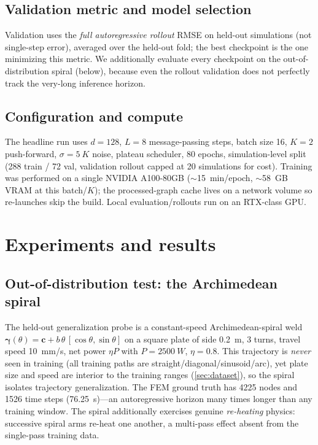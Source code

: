 \documentclass[11pt]{article}
\theoremstyle{definition}
\begin{document}
\subsection{Validation metric and model selection}

Validation uses the \emph{full autoregressive rollout} RMSE on held-out simulations
(not single-step error), averaged over the held-out fold; the best checkpoint is the one
minimizing this metric. We additionally evaluate every checkpoint on the out-of-
distribution spiral (below), because even the rollout validation does not perfectly
track the very-long inference horizon.

\subsection{Configuration and compute}

The headline run uses $d=128$, $L=8$ message-passing steps, batch size 16, $K=2$
push-forward, $\sigma=\SI{5}{K}$ noise, plateau scheduler, 80 epochs, simulation-level
split (\num{288} train / \num{72} val, validation rollout capped at 20 simulations for
cost). Training was performed on a single NVIDIA A100-80GB ($\sim$\SI{15}{min}/epoch,
$\sim$\SI{58}{GB} VRAM at this batch/$K$); the processed-graph cache lives on a network
volume so re-launches skip the build. Local evaluation/rollouts run on an RTX-class GPU.

\section{Experiments and results}
\label{sec:results}

\subsection{Out-of-distribution test: the Archimedean spiral}

The held-out generalization probe is a constant-speed Archimedean-spiral weld
$\bm\gamma(\theta)=\bm c+b\,\theta\,[\cos\theta,\sin\theta]$ on a square plate of side
\SI{0.2}{m}, 3 turns, travel speed \SI{10}{mm/s}, net power $\eta P$ with
$P=\SI{2500}{W}$, $\eta=0.8$. This trajectory is \emph{never} seen in training (all
training paths are straight/diagonal/sinusoid/arc), yet plate size and speed are
interior to the training ranges (\cref{sec:dataset}), so the spiral isolates trajectory
generalization. The FEM ground truth has \num{4225} nodes and \num{1526} time steps
(\SI{76.25}{s})---an autoregressive horizon many times longer than any training window.
The spiral additionally exercises genuine \emph{re-heating} physics: successive spiral
arms re-heat one another, a multi-pass effect absent from the single-pass training data.
\end{document}
